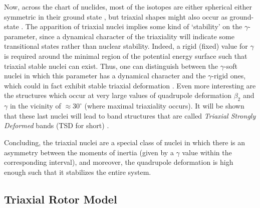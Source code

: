 Now, across the chart of nuclides, most of the isotopes are either spherical either symmetric in their ground state \cite{budaca2018tilted}, but triaxial shapes might also occur as ground-state \cite{moller2006global}. The apparition of triaxial nuclei implies some kind of `stability' on the $\gamma$-parameter, since a dynamical character of the triaxiality will indicate some transitional states rather than nuclear stability. Indeed, a rigid (fixed) value for $\gamma$ is required around the minimal region of the potential energy surface such that triaxial stable nuclei can exist. Thus, one can distinguish between the $\gamma$-soft nuclei in which this parameter has a dynamical character and the $\gamma$-rigid ones, which could in fact exhibit stable triaxial deformation \cite{dracoulis2013isomers}.
Even more interesting are the structures which occur at very large values of quadrupole deformation $\beta_2$ and $\gamma$ in the vicinity of $\approx 30^\circ$ (where maximal triaxiality occurs). It will be shown that these last nuclei will lead to band structures that are called \emph{Triaxial Strongly Deformed} bands (TSD for short) \cite{odegaard2001evidence,jensen2002evidence}.

Concluding, the triaxial nuclei are a special class of nuclei in which there is an asymmetry between the moments of inertia (given by a $\gamma$ value within the corresponding interval), and moreover, the quadrupole deformation is high enough such that it stabilizes the entire system.

\subsection{Triaxial Rotor Model}

